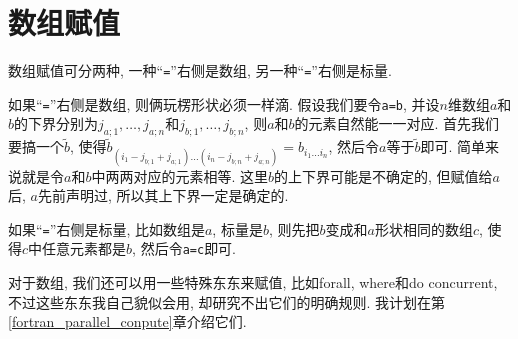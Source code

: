 \section{数组赋值}\label{fortran_array_assignment}

数组赋值可分两种, 一种``\verb|=|''右侧是数组, 另一种``\verb|=|''右侧是标量.

如果``\verb|=|''右侧是数组, 则俩玩楞形状必须一样滴. 假设我们要令\verb|a=b|, 并设$n$维数组$a$和$b$的下界分别为$j_{a;1},\dots,j_{a;n}$和$j_{b;1},\dots,j_{b;n}$, 则$a$和$b$的元素自然能一一对应. 首先我们要搞一个$\tilde{b}$, 使得$\tilde{b}_{(i_1-j_{b;1}+j_{a;1})\dots(i_n-j_{b;n}+j_{a;n})}=b_{i_1\dots i_n}$, 然后令$a$等于$\tilde{b}$即可. 简单来说就是令$a$和$b$中两两对应的元素相等. 这里$b$的上下界可能是不确定的, 但赋值给$a$后, $a$先前声明过, 所以其上下界一定是确定的.

如果``\verb|=|''右侧是标量, 比如数组是$a$, 标量是$b$, 则先把$b$变成和$a$形状相同的数组$c$, 使得$c$中任意元素都是$b$, 然后令\verb|a=c|即可.

对于数组, 我们还可以用一些特殊东东来赋值, 比如forall, where和do concurrent, 不过这些东东我自己貌似会用, 却研究不出它们的明确规则. 我计划在第\ref{fortran_parallel_conpute}章介绍它们.
